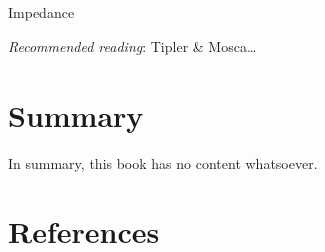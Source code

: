 \documentclass[
  letterpaper,
  DIV=11,
  numbers=noendperiod]{scrreprt}
\newlength{\cslhangindent}
\newenvironment{CSLReferences}[2] %
 {\begin{list}{}{%
  \setlength{\itemindent}{0pt}
  \setlength{\leftmargin}{0pt}
  \setlength{\parsep}{0pt}
  \ifodd #1
   \setlength{\leftmargin}{\cslhangindent}
   \setlength{\itemindent}{-1\cslhangindent}
  \fi
  \setlength{\itemsep}{#2\baselineskip}}}
 {\end{list}}
\begin{document}

\chapter{}\label{section}

\newcommand{\l}{\mathrm{\mathbf{l}}}
\newcommand{\E}{\mathrm{\mathbf{E}}}
\newcommand{\F}{\mathrm{\mathbf{F}}}
\newcommand{\r}{\mathrm{\mathbf{r}}}

\newcommand{\x}{\mathrm{\mathbf{x}}}
\newcommand{\y}{\mathrm{\mathbf{y}}}
\newcommand{\z}{\mathrm{\mathbf{z}}}

Impedance

\emph{Recommended reading}: Tipler \& Mosca\ldots{}


\chapter{Summary}\label{summary-2}

In summary, this book has no content whatsoever.


\chapter*{References}\label{references}


\label{refs}
\begin{CSLReferences}{0}{1}
\end{CSLReferences}
\end{document}
